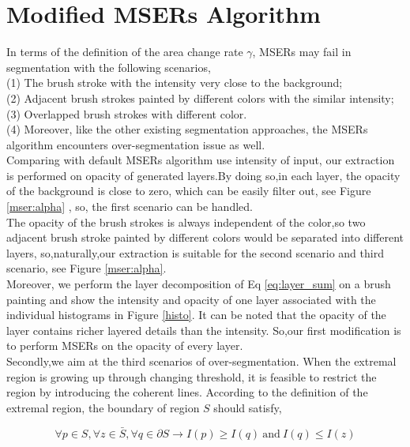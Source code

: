 \section{Modified MSERs Algorithm}

In terms of the definition of the area change rate $\gamma$, MSERs may fail in segmentation with the following scenarios,\\
(1) The brush stroke with the intensity very close to the background; \\
(2) Adjacent brush strokes painted by different colors with the similar intensity;\\
(3) Overlapped brush strokes with different color.\\ 
(4) Moreover, like the other existing segmentation approaches, the MSERs algorithm encounters over-segmentation issue as well. 
\\
Comparing with default MSERs algorithm use intensity of input, our extraction is performed on opacity of generated layers.By doing so,in each layer, the opacity of the background is close to zero, which can be easily filter out, see Figure \ref{mser:alpha} , so, the first scenario can be handled. \\
The opacity of the brush strokes is always independent of the color,so two adjacent brush stroke painted by different colors would be separated into different layers, so,naturally,our extraction is suitable for the second scenario and third scenario, see Figure \ref{mser:alpha}. \\
Moreover, we perform the layer decomposition of Eq \ref{eq:layer_sum} on a brush painting and show the intensity and opacity of one layer associated with the individual histograms in Figure \ref{histo}. It can be noted that the opacity of the layer contains richer layered details than the intensity. So,our first modification is to perform MSERs on the opacity of every layer.\\
Secondly,we aim at the third scenarios of over-segmentation. When the extremal region is growing up through changing threshold, it is feasible to restrict the region by introducing the coherent lines. According to the definition of the extremal region, the boundary of region $S$ should satisfy,

\begin{equation*}
 \forall p \in S,\forall z \in   \bar{S} , \forall q \in \partial S \longrightarrow I(p) \geq I(q)  ~\mathrm{and}~  I(q) \leq I(z)
\end{equation*}
 
